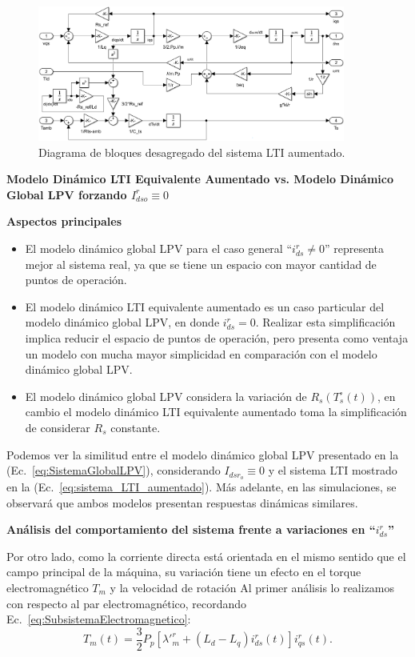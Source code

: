\documentclass{article}
\begin{document}
\begin{figure}[H]
    \centering
    \includegraphics[width=0.9\textwidth]{Imagenes/SistEqLTI_aumentado.png}
    \caption{Diagrama de bloques desagregado del sistema LTI aumentado.}
    \label{fig:diagrama_sistema_LTI_aumentado}
\end{figure}


\noindent\textbf{Modelo Dinámico LTI Equivalente Aumentado vs. Modelo Dinámico Global LPV forzando \(I^r_{dso}\equiv 0 \)}

\textbf{Aspectos principales}
\begin{itemize}
    \item El modelo dinámico global LPV para el caso general ``\(i^r_{ds} \neq 0\)'' representa mejor al sistema real, ya que se tiene un espacio con mayor cantidad de puntos de operación.
    \item El modelo dinámico LTI equivalente aumentado es un caso particular del modelo dinámico global LPV, en donde \(i^r_{ds} = 0\). Realizar esta simplificación implica reducir el espacio de puntos de operación, pero presenta como ventaja un modelo con mucha mayor simplicidad en comparación con el modelo dinámico global LPV.
    \item El modelo dinámico global LPV considera la variación de \(R_{s}(T^\circ_{s}(t))\), en cambio el modelo dinámico LTI equivalente aumentado toma la simplificación de considerar \(R_{s}\) constante.
\end{itemize}
Podemos ver la similitud entre el modelo dinámico global LPV presentado en la (Ec.~\ref{eq:SistemaGlobalLPV}), considerando \(I_{dsr_o} \equiv 0\) y el sistema LTI mostrado en la (Ec.~\ref{eq:sistema_LTI_aumentado}). Más adelante, en las simulaciones, se observará que ambos modelos presentan respuestas dinámicas similares.

\textbf{Análisis del comportamiento del sistema frente a variaciones en ``\(i^r_{ds}\)''}

Por otro lado, como la corriente directa está orientada en el mismo sentido que el campo
principal de la máquina, su variación tiene un efecto en el torque electromagnético $T_{m}$ y la velocidad de rotación
Al primer análisis lo realizamos con respecto al par electromagnético, recordando Ec.~\ref{eq:SubsistemaElectromagnetico}:
 \begin{equation*}
     T_m(t) = \frac{3}{2} P_p [\lambda'^r_m + (L_d - L_q) i_{ds}^r(t)] i_{qs}^r(t).
 \end{equation*}
\end{document}
